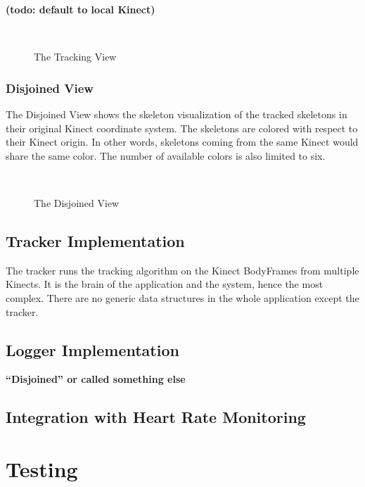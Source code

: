 \documentclass{sigchi}
\begin{document}
\textbf{(todo: default to local Kinect)}

\begin{figure}[!h]
  \centering
  
  \caption{The Tracking View}~\label{fig:tracking_view}
\end{figure}

\subsubsection{Disjoined View}
\label{subsec:disjoined_view}

The Disjoined View shows the skeleton visualization of the tracked skeletons in their original Kinect coordinate system. The skeletons are colored with respect to their Kinect origin. In other words, skeletons coming from the same Kinect would share the same color. The number of available colors is also limited to six.

\begin{figure}[!h]
  \centering
  
  \caption{The Disjoined View}~\label{fig:disjoined_view}
\end{figure}

\subsection{Tracker Implementation}

The tracker runs the tracking algorithm on the Kinect BodyFrames from multiple Kinects. It is the brain of the application and the system, hence the most complex. There are no generic data structures in the whole application except the tracker. 

\subsection{Logger Implementation}



\textbf{``Disjoined'' or called something else}

\subsection{Integration with Heart Rate Monitoring}

\section{Testing}
\label{sec:testing}
\end{document}
